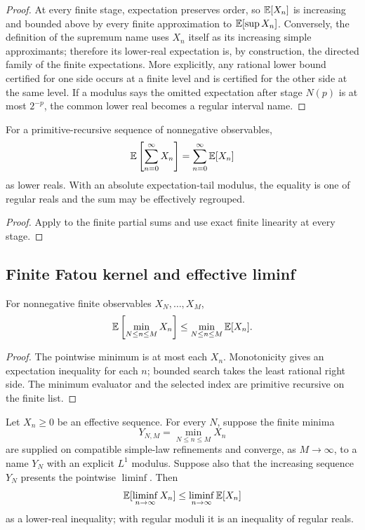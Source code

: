 \begin{proof}
At every finite stage, expectation preserves order, so
\(\mathbb E[X_n]\) is increasing and bounded above by every finite approximation to
\(\mathbb E[\sup X_n]\).  Conversely, the definition of the supremum name uses
\(X_n\) itself as its increasing simple approximants; therefore its lower-real
expectation is, by construction, the directed family of the finite
expectations.  More explicitly, any rational lower bound certified for one
side occurs at a finite level and is certified for the other side at the same
level.  If a modulus says the omitted expectation after stage \(N(p)\) is at
most \(2^{-p}\), the common lower real becomes a regular interval name.
\end{proof}

\begin{corollary}
\label{cor:tonelli}
For a primitive-recursive sequence of nonnegative observables,
\[
 \mathbb E\left[\sum_{n=0}^{\infty}X_n\right]
 =\sum_{n=0}^{\infty}\mathbb E[X_n]
\]
as lower reals.  With an absolute expectation-tail modulus, the equality is
one of regular reals and the sum may be effectively regrouped.
\end{corollary}

\begin{proof}
Apply  to the finite partial sums and use exact
finite linearity at every stage.
\end{proof}

\subsection{Finite Fatou kernel and effective liminf}

\begin{lemma}\label{lem:finite-fatou}
For nonnegative finite observables \(X_N,\ldots,X_M\),
\[
 \mathbb E\left[\min_{N\le n\le M}X_n\right]
 \le \min_{N\le n\le M}\mathbb E[X_n].
\]
\end{lemma}

\begin{proof}
The pointwise minimum is at most each \(X_n\).  Monotonicity gives an
expectation inequality for each \(n\); bounded search takes the least rational
right side.  The minimum evaluator and the selected index are primitive
recursive on the finite list.
\end{proof}

\begin{theorem}\label{thm:fatou}
Let \(X_n\ge0\) be an effective sequence.  For every \(N\), suppose the
finite minima
\[
 Y_{N,M}=\min_{N\le n\le M}X_n
\]
are supplied on compatible simple-law refinements and converge, as
\(M\to\infty\), to a name \(Y_N\) with an explicit \(L^1\) modulus.  Suppose
also that the increasing sequence \(Y_N\) presents the pointwise
\(\liminf\).  Then
\[
 \mathbb E[\mathop{\mathrm{liminf}}_{n\to\infty}X_n]
 \le\mathop{\mathrm{liminf}}_{n\to\infty}\mathbb E[X_n]
\]
as a lower-real inequality; with regular moduli it is an inequality of regular
reals.
\end{theorem}

